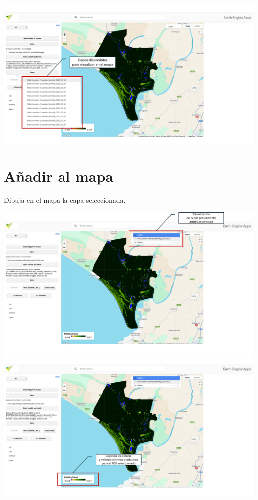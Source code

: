 \documentclass[
]{book}
\begin{document}
\includegraphics{assets/layers_es.png}

\section{\texorpdfstring{\textbf{Añadir al mapa}}{Añadir al mapa}}\label{auxf1adir-al-mapa}

Dibuja en el mapa la capa seleccionada.

\includegraphics{assets/layers_es2.png}
\includegraphics{assets/leyenda_es.png}
\end{document}
